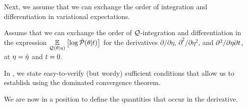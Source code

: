 Next, we assume that we can exchange the order of integration and
differentiation in variational expectations.

%
\begin{assu}
%
Assume that we can exchange the order of $\mathcal{Q}$-integration and differentiation in
the expression $\underset{\mathcal{Q}(\theta \vert \eta)}{\mathbb{E}}\left[\log \tilde{\mathcal{P}}(\theta \vert t)\right]$ for
the derivatives $\partial / \partial \eta$, $\partial^2 / \partial \eta^2$, and
$\partial^2 / \partial \eta \partial t$, at $\eta = \hat\eta$ and $t = 0$.
%
\end{assu}

In , we state easy-to-verify (but wordy) sufficient
conditions that allow us to establish  using the
dominated convergence theorem.

We are now in a position to define the quantities that occur in the derivative.


